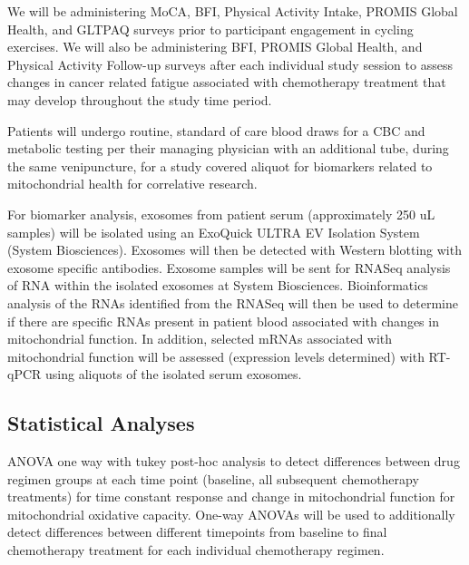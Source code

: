 \documentclass[
]{book}
\begin{document}
We will be administering MoCA, BFI, Physical Activity Intake, PROMIS Global Health, and GLTPAQ surveys prior to participant engagement in cycling exercises. We will also be administering BFI, PROMIS Global Health, and Physical Activity Follow-up surveys after each individual study session to assess changes in cancer related fatigue associated with chemotherapy treatment that may develop throughout the study time period.

Patients will undergo routine, standard of care blood draws for a CBC and metabolic testing per their managing physician with an additional tube, during the same venipuncture, for a study covered aliquot for biomarkers related to mitochondrial health for correlative research.

For biomarker analysis, exosomes from patient serum (approximately 250 uL samples) will be isolated using an ExoQuick ULTRA EV Isolation System (System Biosciences). Exosomes will then be detected with Western blotting with exosome specific antibodies. Exosome samples will be sent for RNASeq analysis of RNA within the isolated exosomes at System Biosciences. Bioinformatics analysis of the RNAs identified from the RNASeq will then be used to determine if there are specific RNAs present in patient blood associated with changes in mitochondrial function. In addition, selected mRNAs associated with mitochondrial function will be assessed (expression levels determined) with RT-qPCR using aliquots of the isolated serum exosomes.

\hypertarget{Appendix-IRB-Protocol-StatisticalAnalyses}{%
\subsection{Statistical Analyses}\label{Appendix-IRB-Protocol-StatisticalAnalyses}}

ANOVA one way with tukey post-hoc analysis to detect differences between drug regimen groups at each time point (baseline, all subsequent chemotherapy treatments) for time constant response and change in mitochondrial function for mitochondrial oxidative capacity. One-way ANOVAs will be used to additionally detect differences between different timepoints from baseline to final chemotherapy treatment for each individual chemotherapy regimen.

  
\end{document}
